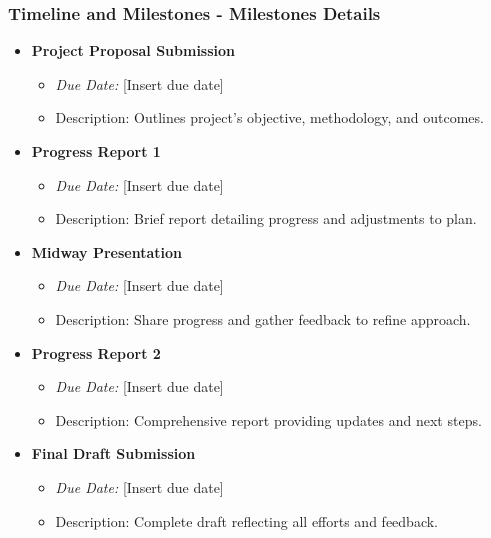 \documentclass[aspectratio=169]{beamer}
\begin{document}
\begin{frame}[fragile]
    \frametitle{Timeline and Milestones - Milestones Details}
    \begin{itemize}
        \item \textbf{Project Proposal Submission}
            \begin{itemize}
                \item \textit{Due Date:} [Insert due date]
                \item Description: Outlines project’s objective, methodology, and outcomes.
            \end{itemize}

        \item \textbf{Progress Report 1}
            \begin{itemize}
                \item \textit{Due Date:} [Insert due date]
                \item Description: Brief report detailing progress and adjustments to plan.
            \end{itemize}

        \item \textbf{Midway Presentation}
            \begin{itemize}
                \item \textit{Due Date:} [Insert due date]
                \item Description: Share progress and gather feedback to refine approach.
            \end{itemize}

        \item \textbf{Progress Report 2}
            \begin{itemize}
                \item \textit{Due Date:} [Insert due date]
                \item Description: Comprehensive report providing updates and next steps.
            \end{itemize}

        \item \textbf{Final Draft Submission}
            \begin{itemize}
                \item \textit{Due Date:} [Insert due date]
                \item Description: Complete draft reflecting all efforts and feedback.
            \end{itemize}


\end{itemize}
\end{frame}
\end{document}
